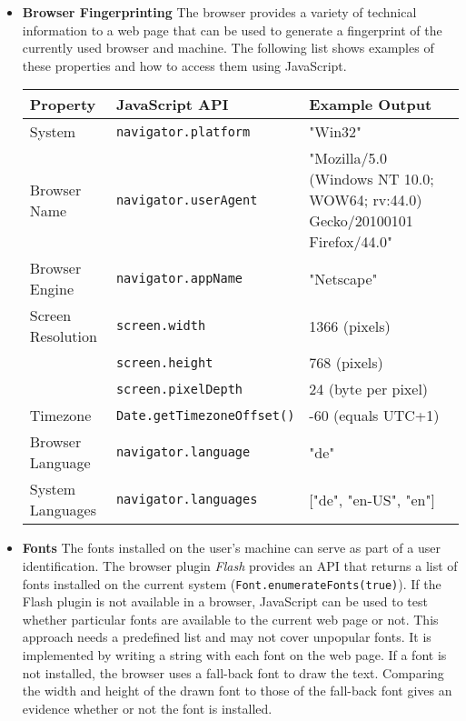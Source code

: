 	\begin{itemize}
		\item \textbf{Browser Fingerprinting} The browser provides a variety of technical information to a web page that can be used to generate a fingerprint of the currently used browser and machine. The following list shows examples of these properties and how to access them using JavaScript. 
		
		\begin{tabular}{|l|l|p{}|} \hline
			\textbf{Property} & \textbf{JavaScript API} & \textbf{Example Output} \\ \hline
			System & \texttt{navigator.platform} & "Win32" \\ \hline
			Browser Name & \texttt{navigator.userAgent} & "Mozilla/5.0 (Windows NT 10.0; WOW64; rv:44.0) Gecko/20100101 Firefox/44.0" \\ \hline
			Browser Engine & \texttt{navigator.appName} & "Netscape" \\ \hline
			Screen Resolution & \texttt{screen.width} & 1366 (pixels) \\
			& \texttt{screen.height} & 768 (pixels) \\
			& \texttt{screen.pixelDepth} & 24 (byte per pixel) \\ \hline
			Timezone & \texttt{Date.getTimezoneOffset()} & -60 (equals UTC+1) \\ \hline
			Browser Language & \texttt{navigator.language} & "de" \\ \hline
			System Languages & \texttt{navigator.languages} & ["de", "en-US", "en"] \\ \hline
		\end{tabular}
		
		\item \textbf{Fonts} The fonts installed on the user's machine can serve as part of a user identification. The browser plugin \textit{Flash} provides an API that returns a list of fonts installed on the current system (\texttt{Font.enumerateFonts(true)})\cite{flashPlayerGetFonts}. If the Flash plugin is not available in a browser, JavaScript can be used to test whether particular fonts are available to the current web page or not. This approach needs a predefined list and may not cover unpopular fonts. It is implemented by writing a string with each font on the web page. If a font is not installed, the browser uses a fall-back font to draw the text. Comparing the width and height of the drawn font to those of the fall-back font gives an evidence whether or not the font is installed.
		

\end{itemize}
